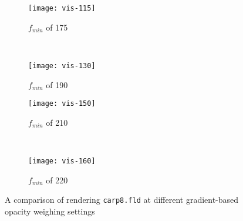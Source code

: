 \begin{figure}[H]
	\ContinuedFloat
	\centering
	\begin{subfigure}[t]{0.45\textwidth}
		\texttt{[image: vis-115]}
		\caption{$f_{min}$ of 175}
	\end{subfigure}
	~%
	\begin{subfigure}[t]{0.45\textwidth}
		\texttt{[image: vis-130]}
		\caption{$f_{min}$ of 190}
	\end{subfigure}
	
	\begin{subfigure}[t]{0.45\textwidth}
		\texttt{[image: vis-150]}
		\caption{$f_{min}$ of 210}
	\end{subfigure}
	~%
	\begin{subfigure}[t]{0.45\textwidth}
		\texttt{[image: vis-160]}
		\caption{$f_{min}$ of 220}
	\end{subfigure}
	
	\caption{A comparison of rendering \texttt{carp8.fld} at different gradient-based opacity weighing settings}
	\label{fig:comp:big}
\end{figure}
